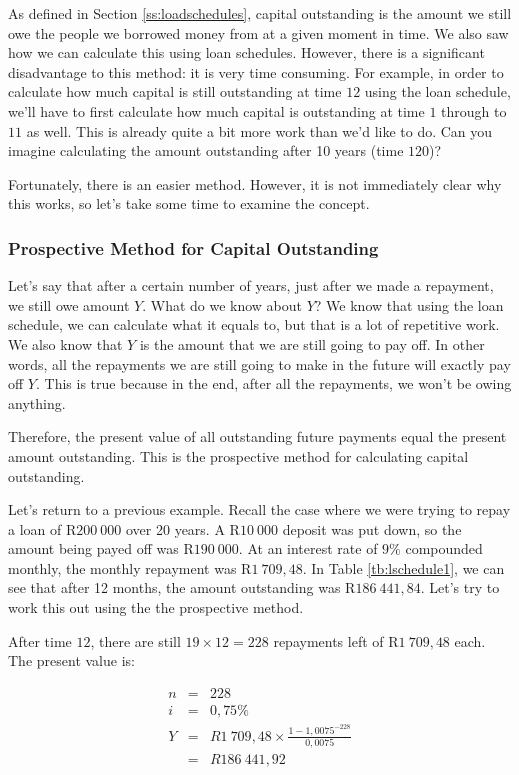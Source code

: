 As defined in Section \ref{ss:loadschedules}, capital outstanding is the amount we still owe the people we borrowed money from at a given moment in time. We also saw how we can calculate this using loan schedules. However, there is a significant disadvantage to this method: it is very time consuming. For example, in order to calculate how much capital is still outstanding at time $12$ using the loan schedule, we'll have to first calculate how much capital is outstanding at time $1$ through to $11$ as well. This is already quite a bit more work than we'd like to do. Can you imagine calculating the amount outstanding after 10 years (time $120$)?

Fortunately, there is an easier method. However, it is not immediately clear why this works, so let's take some time to examine the concept.

\subsubsection{Prospective Method for Capital Outstanding}

Let's say that after a certain number of years, just after we made a repayment, we still owe amount $Y$. What do we know about $Y$? We know that using the loan schedule, we can calculate what it equals to, but that is a lot of repetitive work. We also know that $Y$ is the amount that we are still going to pay off. In other words, all the repayments we are still going to make in the future will exactly pay off $Y$. This is true because in the end, after all the repayments, we won't be owing anything.

Therefore, the present value of all outstanding future payments equal the present amount outstanding. This is the prospective method for calculating capital outstanding.

Let's return to a previous example. Recall the case where we were trying to repay a loan of R$200~000$ over 20 years. A R$10~000$ deposit was put down, so the amount being payed off was R$190~000$. At an interest rate of $9\%$ compounded monthly, the monthly repayment was R$1~709,48$. In Table \ref{tb:lschedule1}, we can see that after 12 months, the amount outstanding was R$186~441,84$. Let's try to work this out using the the prospective method.

After time $12$, there are still $19 \times 12 = 228$ repayments left of R$1~709,48$ each. The present value is:

\begin{eqnarray*}
n &=& 228\\
i &=& 0,75\%\\
Y &=&R1~709,48 \times \frac{1-1,0075^{-228}}{0,0075}\\
&=& R186~441,92\\
\end{eqnarray*}

